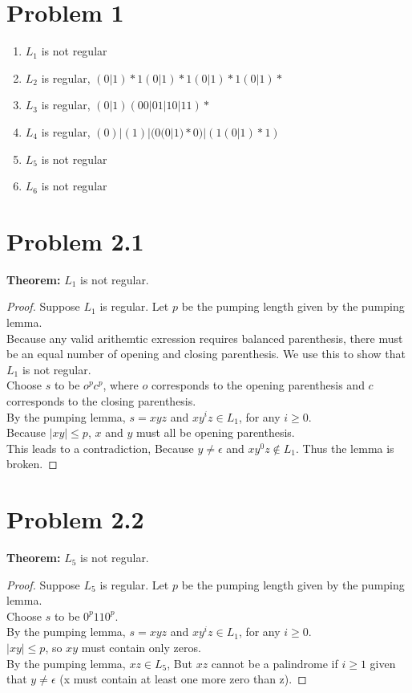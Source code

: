 \documentclass{article}
\newenvironment{problem}[1]{
  \nobreak\section*{Problem #1}
}{}
\begin{document}
  \begin{problem}{1}
    \begin{enumerate}
      \item $L_1$ is not regular
      \item $L_2$ is regular, $(0|1)*1(0|1)*1(0|1)*1(0|1)*$
      \item $L_3$ is regular, $(0|1)(00|01|10|11)*$
      \item $L_4$ is regular, $(0)|(1)|(0(0|1)*0)|(1(0|1)*1)$
      \item $L_5$ is not regular
      \item $L_6$ is not regular
    \end{enumerate}
  \end{problem}

  \begin{problem}{2.1}
    \textbf{Theorem:} $L_1$ is not regular.
    \begin{proof}
      Suppose $L_1$ is regular.  Let $p$ be the pumping length given
      by the pumping lemma.\\
      Because any valid arithemtic exression requires balanced
      parenthesis, there must be an equal number of opening and
      closing parenthesis.  We use this to show that $L_1$ is
      not regular.\\
      Choose $s$ to be $o^pc^p$, where $o$ corresponds to the
      opening parenthesis and $c$ corresponds to the closing
      parenthesis.\\
      By the pumping lemma, $s = xyz$ and $xy^iz \in L_1$, for
      any $i \ge 0$.\\
      Because $|xy| \le p$, $x$ and $y$ must all be opening
      parenthesis.\\
      This leads to a contradiction, Because $y \ne \epsilon$ and
      $xy^0z \notin L_1$.  Thus the lemma is broken.
    \end{proof}
  \end{problem}

  \begin{problem}{2.2}
    \textbf{Theorem:} $L_5$ is not regular.
    \begin{proof}
      Suppose $L_5$ is regular.  Let $p$ be the pumping length given by the
      pumping lemma.\\
      Choose $s$ to be $0^p110^p$.\\
      By the pumping lemma, $s = xyz$ and $xy^iz \in L_1$, for any $i \ge 0$.\\
      $|xy| \le p$, so $xy$ must contain only zeros.\\
      By the pumping lemma, $xz \in L_5$, But $xz$ cannot be a palindrome if $i \ge 1$
      given that $y \ne \epsilon$ (x must contain at least one more zero than z).
    \end{proof}
  \end{problem}
\end{document}
